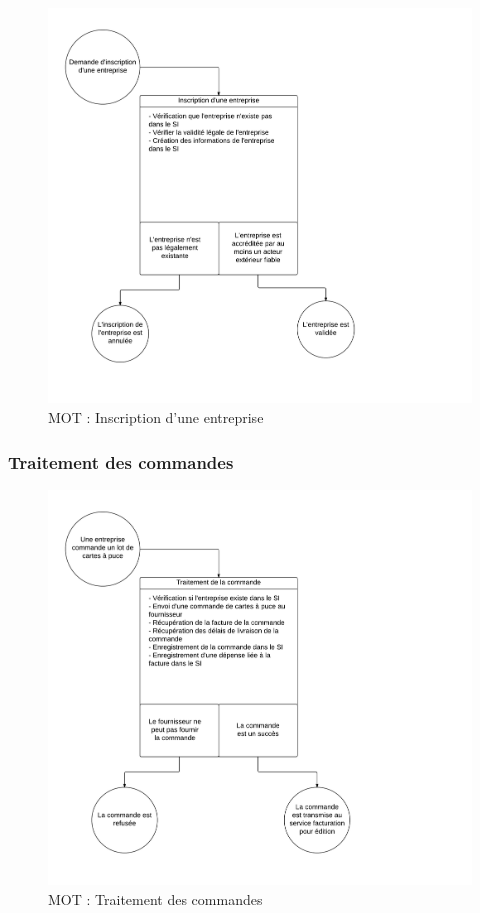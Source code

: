 \begin{figure}[ht!]
    \centering
    \includegraphics[width=\textwidth]{mot-inscription-entreprise}
    \caption{MOT : Inscription d'une entreprise}
    \label{fig:mot-inscription-entreprise}
\end{figure}
\newpage

\subsubsection{Traitement des commandes}

\begin{figure}[ht!]
    \centering
    \includegraphics[width=\textwidth]{mot-traitement-commandes}
    \caption{MOT : Traitement des commandes}
    \label{fig:mot-traitement-commandes}
\end{figure}

